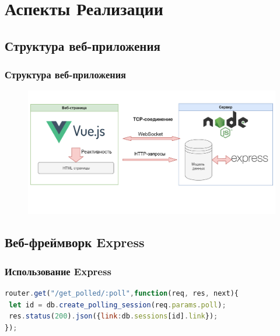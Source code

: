 \documentclass{beamer}
\begin{document}
\section{Аспекты Реализации}

\subsection{Структура веб-приложения}
\begin{frame}
\frametitle{Структура веб-приложения}
\begin{figure}
\includegraphics[width=\linewidth]{img/webdiagram.png}
\end{figure}
\end{frame}


\subsection{Веб-фреймворк Express}
\begin{frame}[fragile] %
\frametitle{Использование Express}

\begin{lstlisting}[language=JavaScript,columns=fullflexible]
router.get("/get_polled/:poll",function(req, res, next){
 let id = db.create_polling_session(req.params.poll);
 res.status(200).json({link:db.sessions[id].link});
});
\end{lstlisting}
\end{frame}
\end{document}
